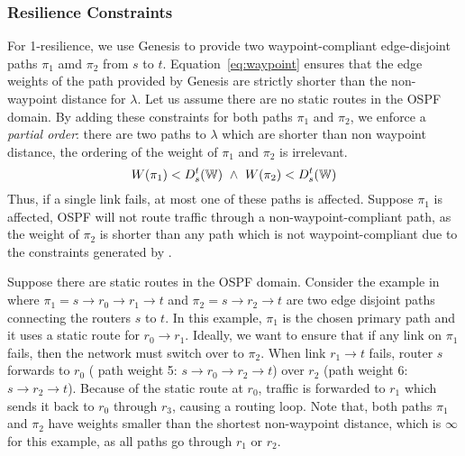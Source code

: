 \subsubsection{Resilience Constraints} \label{sec:ospfresilience}
For 1-resilience, we use Genesis to provide two waypoint-compliant 
edge-disjoint paths $\pi_1$ amd $\pi_2$ from $s$ to $t$.
Equation~\ref{eq:waypoint} ensures that the edge weights 
of the path provided by Genesis are strictly shorter than 
the non-waypoint distance for $\lambda$. 
Let us assume there are no static routes in the 
OSPF domain. By adding these
constraints for both paths $\pi_1$ and $\pi_2$, 
we enforce a \emph{partial order}: there are two paths to $\lambda$
which are shorter than non waypoint distance, the 
ordering of the weight of $\pi_1$ and $\pi_2$ is irrelevant. 
\begin{equation} \label{eq:resilience}
W(\pi_1) < D^t_s(\mathbb{W}) ~\wedge~ W(\pi_2) < D^t_s(\mathbb{W}) 
\end{equation}
Thus, if a single link fails, at most one 
of these paths is affected. Suppose
$\pi_1$ is affected, OSPF will not route traffic through a  
non-waypoint-compliant path, as the weight of $\pi_2$ is shorter than any path which is not waypoint-compliant due to the constraints generated 
by \name.

Suppose there are static routes in the OSPF domain. 
Consider the example in  where 
$\pi_1=s\rightarrow r_0 \rightarrow r_1 \rightarrow t$ 
and $\pi_2=s\rightarrow r_2 \rightarrow t$ 
are two edge disjoint paths 
connecting the routers $s$ to $t$. In this example, 
$\pi_1$ is the 
chosen primary path and it uses a static route
for $r_0 \rightarrow r_1$. 
Ideally, we want to ensure 
that if any link on $\pi_1$ fails, 
then the network must switch over to $\pi_2$. 
When link $r_1 \rightarrow t$ fails,
router $s$ forwards to $r_0$ (
path weight 5: $ s \rightarrow r_0 \rightarrow r_2 \rightarrow t$)
over $r_2$ (path weight 6: $s \rightarrow r_2 \rightarrow t$). 
Because of the static route at $r_0$, traffic is forwarded
to $r_1$ which sends it back to $r_0$ through $r_3$, 
causing a routing loop. Note that, both paths $\pi_1$
and $\pi_2$ have weights smaller than the shortest non-waypoint
 distance, which is $\infty$ for this example, as all paths
 go through $r_1$ or $r_2$. 

